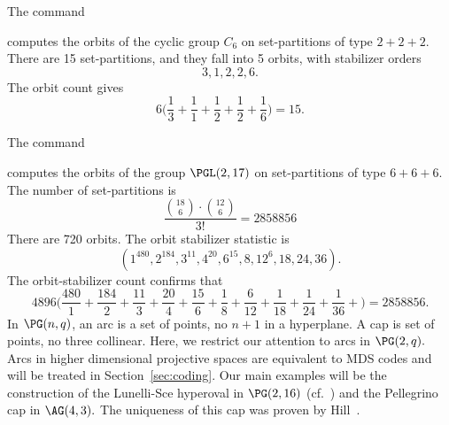 \bigskip




The command
{\tt

}
computes the orbits of the cyclic group $C_6$ on set-partitions of type $2+2+2$.
There are 15 set-partitions, and they fall into 5 orbits, with stabilizer orders
$$
3,1,2,2,6.
$$
The orbit count gives 
$$
6\Big(
\frac{1}{3}+
\frac{1}{1}+
\frac{1}{2}+
\frac{1}{2}+
\frac{1}{6}
\Big)
=15.
$$

\bigskip


The command
{\tt

}
computes the orbits of the  group $\PGL(2,17)$ on set-partitions of type $6+6+6$.
The number of set-partitions is 
$$
\frac{{18 \choose 6} \cdot {12 \choose 6}}{3!}
=2858856
$$
There are 720 orbits. The orbit stabilizer statistic is 
$$
( 1^{480}, 2^{184}, 3^{11}, 4^{20}, 6^{15}, 8, 12^6, 18, 24, 36 ).
$$
The orbit-stabilizer count confirms that
$$
4896
\Big(
\frac{480}{1}+
\frac{184}{2}+
\frac{11}{3}+
\frac{20}{4}+
\frac{15}{6}+
\frac{1}{8}+
\frac{6}{12}+
\frac{1}{18}+
\frac{1}{24}+
\frac{1}{36}+
\Big)
=2858856.
$$
In $\PG(n,q)$, an arc is a set of points, no $n+1$ in a hyperplane.
A cap is  set of points, no three collinear.
Here, we restrict our attention to arcs in $\PG(2,q).$  
Arcs in higher dimensional  projective spaces 
are equivalent to MDS codes and will be treated in Section~\ref{sec:coding}.
Our main examples will be the construction of the Lunelli-Sce hyperoval in $\PG(2,16)$ 
(cf.~\cite{LunelliSce58})
and the Pellegrino cap in $\AG(4,3).$ 
The uniqueness of this cap was proven by Hill~\cite{Hill83}.

\bigskip


